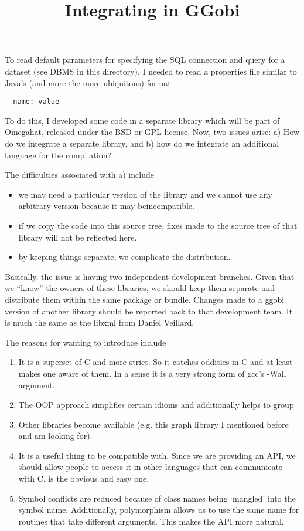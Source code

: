 \documentclass{article}
\title{Integrating \Cplus{} in GGobi}
\begin{document}
\maketitle
To read default parameters for specifying the SQL connection and query
for a dataset (see DBMS in this directory), I needed to read a
properties file similar to Java's (and more the more ubiquitous)
format
\begin{verbatim}
  name: value
\end{verbatim}
To do this, I developed some \Cplus{} code in a separate library which
will be part of Omegahat, released under the BSD or GPL license.
Now, two issues arise: a) How do we integrate
a separate library, and b) how do we integrate an
additional language for the compilation?

The difficulties associated with a)  include
\begin{itemize}
\item we may need a particular version of the library
and we cannot use any arbitrary version
because it may beincompatible.
\item if we copy the code into this source tree,
fixes made to the source tree of that library will not
be reflected here.
\item by keeping things separate, we complicate 
the distribution.
\end{itemize}
Basically, the issue is having two independent development branches.
Given that we ``know'' the owners of these libraries, we should keep
them separate and distribute them within the same package or bundle.
Changes made to a ggobi version of another library should be reported
back to that development team.  It is much the same as the libxml from
Daniel Veillard.


The reasons for wanting to introduce \Cplus{} include
\begin{enumerate}
\item It is a superset of C and more strict.  So it catches oddities
in C and at least makes one aware of them.  In a sense it is a very
strong form of gcc's -Wall argument.
\item The OOP approach simplifies certain
idioms and additionally helps to group
\item Other libraries become available (e.g. this graph library
I mentioned before and am looking for).
\item It is a useful thing to be compatible with.  Since we are
providing an API, we should allow people to access it in other
languages that can communicate with C.  \Cplus{} is the obvious and
easy one.
\item Symbol conflicts are reduced because of class names being
`mangled' into the symbol name.  Additionally, polymorphism allows us
to use the same name for routines that take different arguments. This
makes the API more natural.
\end{enumerate}
\end{document}
